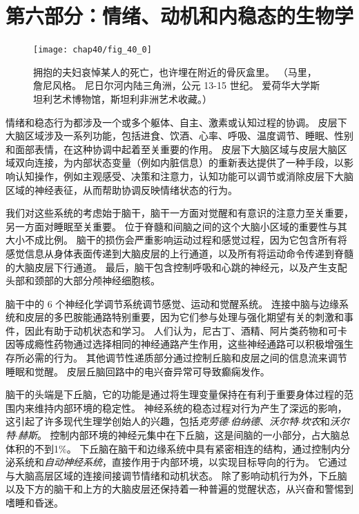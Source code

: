 \chapter*{第六部分：情绪、动机和内稳态的生物学}

\begin{figure}[htbp]
	\centering
	\texttt{[image: chap40/fig\_40\_0]}
	\caption{拥抱的夫妇哀悼某人的死亡，也许埋在附近的骨灰盒里。
		（马里，詹尼风格。
		尼日尔河内陆三角洲，公元 13-15 世纪。
		爱荷华大学斯坦利艺术博物馆，斯坦利非洲艺术收藏。）}
	\label{fig:40_0}
\end{figure}


情绪和稳态行为都涉及一个或多个躯体、自主、激素或认知过程的协调。
皮层下大脑区域涉及一系列功能，包括进食、饮酒、心率、呼吸、温度调节、睡眠、性别和面部表情，在这种协调中起着至关重要的作用。
皮层下大脑区域与皮层大脑区域双向连接，为内部状态变量（例如内脏信息）的重新表达提供了一种手段，以影响认知操作，例如主观感受、决策和注意力，认知功能可以调节或消除皮层下大脑区域的神经表征，从而帮助协调反映情绪状态的行为。



我们对这些系统的考虑始于脑干，脑干一方面对觉醒和有意识的注意力至关重要，另一方面对睡眠至关重要。
位于脊髓和间脑之间的这个大脑小区域的重要性与其大小不成比例。
脑干的损伤会严重影响运动过程和感觉过程，因为它包含所有将感觉信息从身体表面传递到大脑皮层的上行通道，以及所有将运动命令传递到脊髓的大脑皮层下行通道。
最后，脑干包含控制呼吸和心跳的神经元，以及产生支配头部和颈部的大部分颅神经细胞核。


脑干中的 6 个神经化学调节系统调节感觉、运动和觉醒系统。
连接中脑与边缘系统和皮层的多巴胺能通路特别重要，因为它们参与处理与强化期望有关的刺激和事件，因此有助于动机状态和学习。
人们认为，尼古丁、酒精、阿片类药物和可卡因等成瘾性药物通过选择相同的神经通路产生作用，这些神经通路可以积极增强生存所必需的行为。
其他调节性递质部分通过控制丘脑和皮层之间的信息流来调节睡眠和觉醒。
皮层丘脑回路中的电兴奋异常可导致癫痫发作。


脑干的头端是下丘脑，它的功能是通过将生理变量保持在有利于重要身体过程的范围内来维持内部环境的稳定性。
神经系统的稳态过程对行为产生了深远的影响，这引起了许多现代生理学创始人的兴趣，包括\textit{克劳德$\cdot$伯纳德}、\textit{沃尔特$\cdot$坎农}和\textit{沃尔特$\cdot$赫斯}。
控制内部环境的神经元集中在下丘脑，这是间脑的一小部分，占大脑总体积的不到1\%。
下丘脑在脑干和边缘系统中具有紧密相连的结构，通过控制内分泌系统和\textit{自动神经系统}，直接作用于内部环境，以实现目标导向的行为。
它通过与大脑高层区域的连接间接调节情绪和动机状态。
除了影响动机行为外，下丘脑以及下方的脑干和上方的大脑皮层还保持着一种普遍的觉醒状态，从兴奋和警惕到嗜睡和昏迷。


